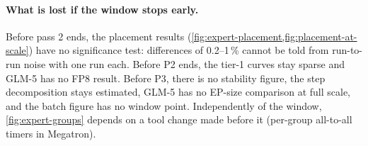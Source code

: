 \paragraph{What is lost if the window stops early.} Before pass 2 ends, the placement results
(\cref{fig:expert-placement,fig:placement-at-scale}) have no significance test: differences of 0.2--1\,\% cannot
be told from run-to-run noise with one run each. Before P2 ends, the tier-1 curves stay sparse and GLM-5 has
no FP8 result. Before P3, there is no stability figure, the step decomposition stays estimated, GLM-5 has no
EP-size comparison at full scale, and the batch figure has no window point. Independently of the window,
\cref{fig:expert-groups} depends on a tool change made before it (per-group all-to-all timers in Megatron).
